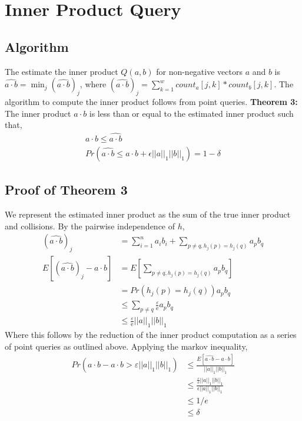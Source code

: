 \documentclass[11pt]{article}
\begin{document}
\section{Inner Product Query}
	\subsection{Algorithm}
		The estimate the inner product $\mathit{Q}(a,b)$ for non-negative vectors $a$ and $b$ is $\widehat{a \cdot b} = \min_j(\widehat{a \cdot b})_j$, where $(\widehat{a \cdot b})_j = \sum_{k=1}^w count_a[j,k] * count_b[j,k]$. The algorithm to compute the inner product follows from point queries.
		\textbf{Theorem 3:} The inner product $a \cdot b$ is less than or equal to the estimated inner product such that,
		\begin{align}
		a \cdot b \leq \widehat{a \cdot b} \\
		Pr(\widehat{a \cdot b} \leq a \cdot b + \epsilon||a||_1||b||_1) = 1-\delta
		\end{align}

	\subsection{Proof of Theorem 3}
		We represent the estimated inner product as the sum of the true inner product and collisions. By the pairwise independence of $h$,
		\begin{align}
		(\widehat{a \cdot b})_j &= \sum_{i=1}^n a_ib_i + \sum_{p \neq q, h_j(p)=h_j(q)} a_pb_q \\
		E\left[(\widehat{a \cdot b})_j - a \cdot b\right] &= E\left[\sum_{p \neq q, h_j(p)=h_j(q)} a_pb_q\right] \\
		&= Pr(h_j(p) = h_j(q))a_pb_q \\
		&\leq \sum_{p \neq q} \frac{\varepsilon}{\mathrm{e}}a_pb_q \\
		&\leq \frac{\varepsilon}{\mathrm e}||a||_1||b||_1
		\end{align}
		Where this follows by the reduction of the inner product computation as a series of point queries as outlined above. Applying the markov inequality,
		\begin{align}
		Pr(\widehat{a \cdot b} - a \cdot b > \varepsilon ||a||_1||b||_1) &\leq \frac{E[\widehat{a \cdot b} - a \cdot b]}{||a||_1||b||_1} \\
		&\leq \frac{\frac{\varepsilon}{\mathrm e}||a||_1||b||_1}{\epsilon||a||_1||b||_1} \\
		& \leq 1/e \\
		&\leq \delta
		\end{align}
\end{document}
